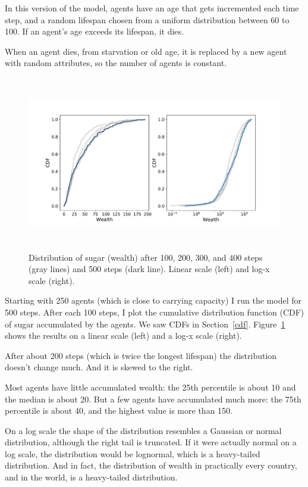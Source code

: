 \documentclass[12pt]{book}
\theoremstyle{exercise}
\begin{document}

In this version of the model, agents have an age that gets incremented
each time step, and a random lifespan chosen from a uniform distribution between 60 to 100.  If an agent's age exceeds its lifespan, it dies.

When an agent dies, from starvation or old age, it is replaced by
a new agent with random attributes, so the number of agents is
constant.

\begin{figure}
\centerline{\includegraphics[height=3in]{figs/chap09-4.pdf}}
\caption{Distribution of sugar (wealth) after 100, 200, 300, and
400 steps (gray lines) and 500 steps (dark line).  Linear scale (left)
and log-x scale (right). }
\label{chap09-4}
\end{figure}

Starting with 250 agents (which is close to carrying capacity) I run
the model for 500 steps.  After each 100 steps, I plot the cumulative distribution function (CDF) of sugar accumulated by the agents.  We saw CDFs in Section~\ref{cdf}.  Figure~\ref{chap09-4} shows the
results on a linear scale (left) and a log-x scale (right).


After about 200 steps (which is twice the longest lifespan) the
distribution doesn't change much.  And it is skewed to the right.

Most agents have little accumulated wealth: the 25th percentile is
about 10 and the median is about 20.  But a few agents have accumulated
much more: the 75th percentile is about 40, and the highest value is
more than 150.

On a log scale the shape of the distribution resembles a Gaussian or
normal distribution, although the right tail is truncated.  If it were
actually normal on a log scale, the distribution would be lognormal,
which is a heavy-tailed distribution.  And in fact, the distribution
of wealth in practically every country, and in the world, is a
heavy-tailed distribution.
\end{document}
